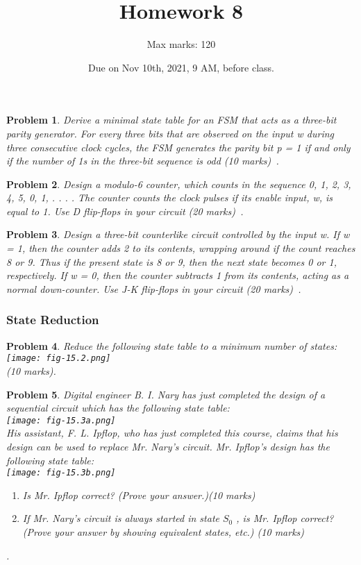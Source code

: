\documentclass[twocolumn]{article}
\title{Homework 8}
\author{Max marks: 120}
\date{Due on Nov 10th, 2021, 9 AM, before class.}
\newtheorem{prob}{Problem}
\begin{document}
\maketitle
\begin{prob}
  Derive a minimal state table for an FSM that acts as a three-bit parity
generator. For every three bits that are observed on the input w during three
consecutive clock cycles, the FSM generates the parity bit p = 1 if and only if
the number of 1s in the three-bit sequence is odd (10 marks)~\cite[Prob 6.12]{brown2013fundamentals}.
\end{prob}

\begin{prob}
  Design a modulo-6 counter, which counts in the sequence 0, 1, 2, 3, 4, 5, 0,
1, . . . . The counter counts the clock pulses if its enable input, w, is equal
to 1. Use D flip-flops in your circuit (20 marks)~\cite[Prob 6.23]{brown2013fundamentals}.
\end{prob}


\begin{prob}
  Design a three-bit counterlike circuit controlled by the input w. If w = 1,
then the counter adds 2 to its contents, wrapping around if the count reaches 8
or 9. Thus if the present state is 8 or 9, then the next state becomes 0 or 1,
respectively. If w = 0, then the counter subtracts 1 from its contents, acting
as a normal down-counter. Use J-K flip-flops in your circuit (20
marks)~\cite[Prob 6.26]{brown2013fundamentals}.
\end{prob}

\subsubsection*{State Reduction}
\begin{prob}
  Reduce the following state table to a minimum number of states:\\
  \texttt{[image: fig-15.2.png]}\\
  (10 marks).
\end{prob}

\begin{prob}
  Digital engineer B. I. Nary has just completed the design of a sequential circuit
  which has the following state table:\\
  \texttt{[image: fig-15.3a.png]}\\
  His assistant, F. L. Ipflop, who has just completed this course, claims that
his design can be used to replace Mr. Nary’s circuit. Mr. Ipflop’s design has
the following state table:\\
\texttt{[image: fig-15.3b.png]}\\
\begin{enumerate}
\item Is Mr. Ipflop correct? (Prove your answer.)(10 marks)
\item If Mr. Nary’s circuit is always started in state $S_0$ , is Mr. Ipflop correct? (Prove
  your answer by showing equivalent states, etc.) (10 marks)
  \end{enumerate} .
\end{prob}
\end{document}
